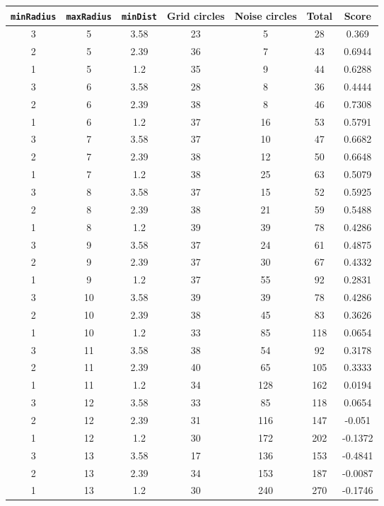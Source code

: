 \documentclass[letterpaper, 12pt]{article}
\begin{document}
\begin{longtable}{|c|c|c|c|c|c|c|}
\hline
\textbf{\texttt{minRadius}} & \textbf{\texttt{maxRadius}} & \textbf{\texttt{minDist}} & \textbf{Grid circles} & \textbf{Noise circles} & \textbf{Total} & \textbf{Score} \\
\hline
3 & 5 & 3.58 & 23 & 5 & 28 & 0.369 \\
\hline
2 & 5 & 2.39 & 36 & 7 & 43 & 0.6944 \\
\hline
1 & 5 & 1.2 & 35 & 9 & 44 & 0.6288 \\
\hline
3 & 6 & 3.58 & 28 & 8 & 36 & 0.4444 \\
\hline
2 & 6 & 2.39 & 38 & 8 & 46 & 0.7308 \\
\hline
1 & 6 & 1.2 & 37 & 16 & 53 & 0.5791 \\
\hline
3 & 7 & 3.58 & 37 & 10 & 47 & 0.6682 \\
\hline
2 & 7 & 2.39 & 38 & 12 & 50 & 0.6648 \\
\hline
1 & 7 & 1.2 & 38 & 25 & 63 & 0.5079 \\
\hline
3 & 8 & 3.58 & 37 & 15 & 52 & 0.5925 \\
\hline
2 & 8 & 2.39 & 38 & 21 & 59 & 0.5488 \\
\hline
1 & 8 & 1.2 & 39 & 39 & 78 & 0.4286 \\
\hline
3 & 9 & 3.58 & 37 & 24 & 61 & 0.4875 \\
\hline
2 & 9 & 2.39 & 37 & 30 & 67 & 0.4332 \\
\hline
1 & 9 & 1.2 & 37 & 55 & 92 & 0.2831 \\
\hline
3 & 10 & 3.58 & 39 & 39 & 78 & 0.4286 \\
\hline
2 & 10 & 2.39 & 38 & 45 & 83 & 0.3626 \\
\hline
1 & 10 & 1.2 & 33 & 85 & 118 & 0.0654 \\
\hline
3 & 11 & 3.58 & 38 & 54 & 92 & 0.3178 \\
\hline
2 & 11 & 2.39 & 40 & 65 & 105 & 0.3333 \\
\hline
1 & 11 & 1.2 & 34 & 128 & 162 & 0.0194 \\
\hline
3 & 12 & 3.58 & 33 & 85 & 118 & 0.0654 \\
\hline
2 & 12 & 2.39 & 31 & 116 & 147 & -0.051 \\
\hline
1 & 12 & 1.2 & 30 & 172 & 202 & -0.1372 \\
\hline
3 & 13 & 3.58 & 17 & 136 & 153 & -0.4841 \\
\hline
2 & 13 & 2.39 & 34 & 153 & 187 & -0.0087 \\
\hline
1 & 13 & 1.2 & 30 & 240 & 270 & -0.1746 \\

\end{longtable}
\end{document}

